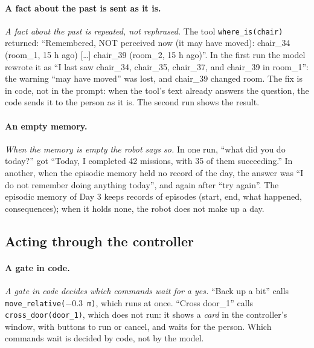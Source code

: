 \documentclass[11pt]{article}
\newcommand{\slt}[1]{\emph{#1}}   %
\begin{document}
\paragraph{A fact about the past is sent as it is.} \slt{A fact about the past is repeated, not rephrased.} The tool \texttt{where\_is(chair)} returned: ``Remembered, NOT perceived now (it may have moved): chair\_34 (room\_1, 15 h ago) [\ldots] chair\_39 (room\_2, 15 h ago)''. In the first run the model rewrote it as ``I last saw chair\_34, chair\_35, chair\_37, and chair\_39 in room\_1'': the warning ``may have moved'' was lost, and chair\_39 changed room. The fix is in code, not in the prompt: when the tool's text already answers the question, the code sends it to the person as it is. The second run shows the result.

\paragraph{An empty memory.} \slt{When the memory is empty the robot says so.} In one run, ``what did you do today?'' got ``Today, I completed 42 missions, with 35 of them succeeding.'' In another, when the episodic memory held no record of the day, the answer was ``I do not remember doing anything today'', and again after ``try again''. The episodic memory of Day 3 keeps records of episodes (start, end, what happened, consequences); when it holds none, the robot does not make up a day.

\subsection{Acting through the controller}

\paragraph{A gate in code.} \slt{A gate in code decides which commands wait for a yes.} ``Back up a bit'' calls \texttt{move\_relative($-0.3$ m)}, which runs at once. ``Cross door\_1'' calls \texttt{cross\_door(door\_1)}, which does not run: it shows a \emph{card} in the controller's window, with buttons to run or cancel, and waits for the person. Which commands wait is decided by code, not by the model.
\end{document}
